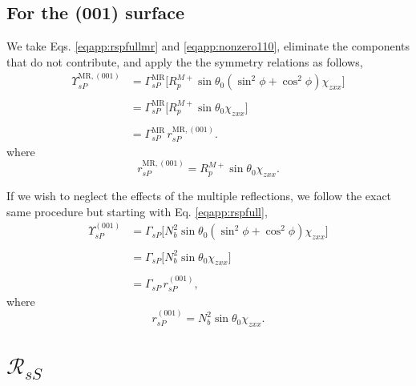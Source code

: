 \subsection{For the (001) surface}

We take Eqs. \eqref{eqapp:rspfullmr} and \eqref{eqapp:nonzero110}, eliminate the
components that do not contribute, and apply the the symmetry relations as
follows,
\begin{equation*}
\begin{split}
\Upsilon^{\mathrm{MR},(001)}_{sP} &=
\Gamma^{\mathrm{MR}}_{sP}
\big[
R^{M+}_{p}\sin\theta_{0}(\sin^{2}\phi + \cos^{2}\phi)\chi_{zxx}
\big]\\\\
&=
\Gamma^{\mathrm{MR}}_{sP}
\big[
R^{M+}_{p}\sin\theta_{0}\chi_{zxx}
\big]\\\\
&= \Gamma^{\mathrm{MR}}_{sP}\,r^{\mathrm{MR},(001)}_{sP}.
\end{split}
\end{equation*}
where
\begin{equation}\label{eqapp:final-rsp.mr.001}
r^{\mathrm{MR},(001)}_{sP} = 
R^{M+}_{p}\sin\theta_{0}\chi_{zxx}.
\end{equation}

If we wish to neglect the effects of the multiple reflections, we follow the
exact same procedure but starting with Eq. \eqref{eqapp:rspfull},
\begin{equation*}
\begin{split}
\Upsilon^{(001)}_{sP} &=
\Gamma_{sP}
\big[
N^{2}_{b}\sin\theta_{0}(\sin^{2}\phi + \cos^{2}\phi)\chi_{zxx}
\big]\\\\
&=
\Gamma_{sP}
\big[
N^{2}_{b}\sin\theta_{0}\chi_{zxx}
\big]\\\\
&=
\Gamma_{sP}\,r^{(001)}_{sP},
\end{split}
\end{equation*}
where
\begin{equation}\label{eqapp:final-rsp.001}
r^{(001)}_{sP} = 
N^{2}_{b}\sin\theta_{0}\chi_{zxx}.
\end{equation}




\section{\texorpdfstring{$\mathcal{R}_{sS}$}{RsS}}

